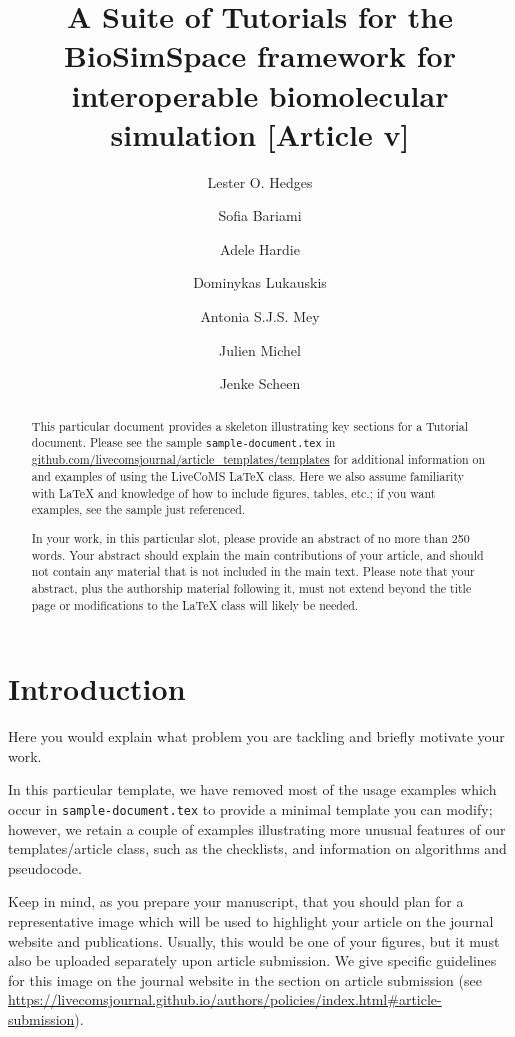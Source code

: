 \documentclass[9pt,tutorial]{livecoms}
\title{A Suite of Tutorials for the BioSimSpace framework for interoperable biomolecular simulation [Article v\versionnumber]}
\author[1*]{Lester O. Hedges}
\author[]{Sofia Bariami}
\author[2]{Adele Hardie}
\author[3]{Dominykas Lukauskis}
\author[2]{Antonia S.J.S. Mey}
\author[2*]{Julien Michel}
\author[2\authfn{1}]{Jenke Scheen}
\affil[1]{Advanced Computing Research Centre, University of Bristol, UK}
\affil[2]{EaStCHEM School of
Chemistry, University of Edinburgh, UK}
\affil[3]{Department of Chemistry and Institute of Structural and Molecular Biology, University College
London, UK}
\begin{document}
\begin{frontmatter}
\maketitle

\begin{abstract}
This particular document provides a skeleton illustrating key sections for a Tutorial document.
Please see the sample \texttt{sample-document.tex} in \url{github.com/livecomsjournal/article_templates/templates} for additional information on and examples of using the LiveCoMS LaTeX class.
Here we also assume familiarity with LaTeX and knowledge of how to include figures, tables, etc.; if you want examples, see the sample just referenced.

In your work, in this particular slot, please provide an abstract of no more than 250 words.
Your abstract should explain the main contributions of your article, and should not contain any material that is not included in the main text.
Please note that your abstract, plus the authorship material following it, must not extend beyond the title page or modifications to the LaTeX class will likely be needed.
\end{abstract}

\end{frontmatter}




\section{Introduction}

Here you would explain what problem you are tackling and briefly motivate your work.

In this particular template, we have removed most of the usage examples which occur in \texttt{sample-document.tex} to provide a minimal template you can modify; however, we retain a couple of examples illustrating more unusual features of our templates/article class, such as the checklists, and information on algorithms and pseudocode.

Keep in mind, as you prepare your manuscript, that you should plan for a representative image  which will be used to highlight your article on the journal website and publications. Usually, this would be one of your figures, but it must also be uploaded separately upon article submission. We give specific guidelines for this image on the journal website in the section on article submission (see \url{https://livecomsjournal.github.io/authors/policies/index.html#article-submission}).
\end{document}
